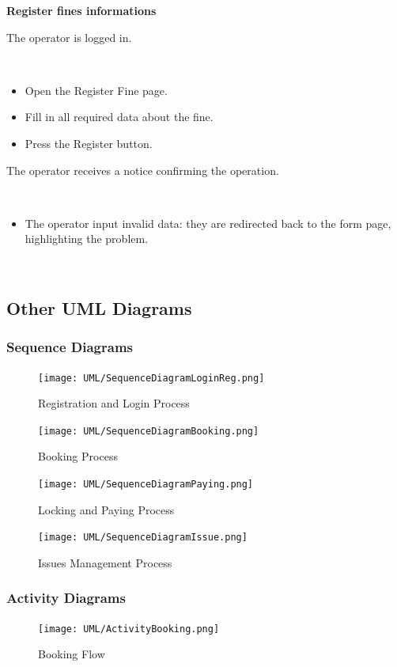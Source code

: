 \documentclass[11pt]{article} %
\begin{document}
\begin{description}[noitemsep,topsep=0pt,parsep=0pt,partopsep=0pt]
	\item[Name:] \textbf{Register fines informations}
	\item[Entry Conditions:] The operator is logged in.
	\item[Flow Of Events:] \hfill\
	\begin{itemize}
		\item Open the Register Fine page.
		\item Fill in all required data about the fine.
		\item Press the Register button.
	\end{itemize}
	\item[Exit conditions:]  The operator receives a notice confirming the operation.
	\item[Exceptions:] \hfill\
	\begin{itemize}
		\item The operator input invalid data: they are redirected back to the form page, highlighting the problem.
	\end{itemize}
\end{description}
\hfill\

\subsection{Other UML Diagrams}

\subsubsection{Sequence Diagrams}
\begin{figure}[H]
	\centering
	\texttt{[image: UML/SequenceDiagramLoginReg.png]}
	\caption{Registration and Login Process}
\end{figure}
\begin{figure}[H]
	\centering
	\texttt{[image: UML/SequenceDiagramBooking.png]}
	\caption{Booking Process}
\end{figure}
\begin{figure}[H]
	\centering
	\texttt{[image: UML/SequenceDiagramPaying.png]}
	\caption{Locking and Paying Process}
\end{figure}
\begin{figure}[H]
	\centering
	\texttt{[image: UML/SequenceDiagramIssue.png]}
	\caption{Issues Management Process}
\end{figure}

\subsubsection{Activity Diagrams}
\begin{figure}[H]
	\centering
	\texttt{[image: UML/ActivityBooking.png]}
	\caption{Booking Flow}
\end{figure}
\end{document}
